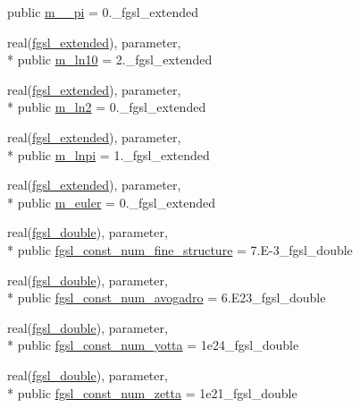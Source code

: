 \begin{DoxyCompactItemize}
public \hyperlink{classfgsl_a28e530e58a51ac2bbce00674f617bbbd}{m\-\_\-\_\-pi} = 0.\-\_\-fgsl\-\_\-extended
\item 
real(\hyperlink{classfgsl_a9f38abe97062020e8a507aaa5bc683ab}{fgsl\-\_\-extended}), parameter, \\*
public \hyperlink{classfgsl_a152b62af261c671c54b99ac278df759d}{m\-\_\-ln10} = 2.\-\_\-fgsl\-\_\-extended
\item 
real(\hyperlink{classfgsl_a9f38abe97062020e8a507aaa5bc683ab}{fgsl\-\_\-extended}), parameter, \\*
public \hyperlink{classfgsl_a126c02aa2554290ff648243425e03ace}{m\-\_\-ln2} = 0.\-\_\-fgsl\-\_\-extended
\item 
real(\hyperlink{classfgsl_a9f38abe97062020e8a507aaa5bc683ab}{fgsl\-\_\-extended}), parameter, \\*
public \hyperlink{classfgsl_ae9aff58d6fcadaab60410424796cd713}{m\-\_\-lnpi} = 1.\-\_\-fgsl\-\_\-extended
\item 
real(\hyperlink{classfgsl_a9f38abe97062020e8a507aaa5bc683ab}{fgsl\-\_\-extended}), parameter, \\*
public \hyperlink{classfgsl_ab8079b9a6e17b1def176e97feda2a841}{m\-\_\-euler} = 0.\-\_\-fgsl\-\_\-extended
\item 
real(\hyperlink{classfgsl_a9af5113378e0f000eb479d3f90196ddf}{fgsl\-\_\-double}), parameter, \\*
public \hyperlink{classfgsl_aa12fc22d559b707d7e1e63ac17c596cb}{fgsl\-\_\-const\-\_\-num\-\_\-fine\-\_\-structure} = 7.\-E-\/3\-\_\-fgsl\-\_\-double
\item 
real(\hyperlink{classfgsl_a9af5113378e0f000eb479d3f90196ddf}{fgsl\-\_\-double}), parameter, \\*
public \hyperlink{classfgsl_a009cf79cdb578326cbceea51aa302e53}{fgsl\-\_\-const\-\_\-num\-\_\-avogadro} = 6.\-E23\-\_\-fgsl\-\_\-double
\item 
real(\hyperlink{classfgsl_a9af5113378e0f000eb479d3f90196ddf}{fgsl\-\_\-double}), parameter, \\*
public \hyperlink{classfgsl_a0b9812de1b4fd0e830437a0f81756409}{fgsl\-\_\-const\-\_\-num\-\_\-yotta} = 1e24\-\_\-fgsl\-\_\-double
\item 
real(\hyperlink{classfgsl_a9af5113378e0f000eb479d3f90196ddf}{fgsl\-\_\-double}), parameter, \\*
public \hyperlink{classfgsl_adbd48c7f748a96cfbe32705159c06b84}{fgsl\-\_\-const\-\_\-num\-\_\-zetta} = 1e21\-\_\-fgsl\-\_\-double

\end{DoxyCompactItemize}
